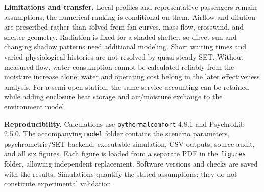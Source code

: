 \documentclass[12pt]{article}
\begin{document}
\noindent\textbf{Limitations and transfer.} Local profiles and representative passengers remain assumptions; the numerical ranking is conditional on them. Airflow and dilution are prescribed rather than solved from fan curves, mass flow, crosswind, and shelter geometry. Radiation is fixed for a shaded shelter, so direct sun and changing shadow patterns need additional modeling. Short waiting times and varied physiological histories are not resolved by quasi-steady SET. Without measured flow, water consumption cannot be calculated reliably from the moisture increase alone; water and operating cost belong in the later effectiveness analysis. For a semi-open station, the same service accounting can be retained while adding enclosure heat storage and air/moisture exchange to the environment model.

\noindent\textbf{Reproducibility.} Calculations use \texttt{pythermalcomfort} 4.8.1 and PsychroLib 2.5.0. The accompanying \texttt{model} folder contains the scenario parameters, psychrometric/SET backend, executable simulation, CSV outputs, source audit, and all six figures. Each figure is loaded from a separate PDF in the \texttt{figures} folder, allowing independent replacement. Software versions and checks are saved with the results. Simulations quantify the stated assumptions; they do not constitute experimental validation.
\end{document}
